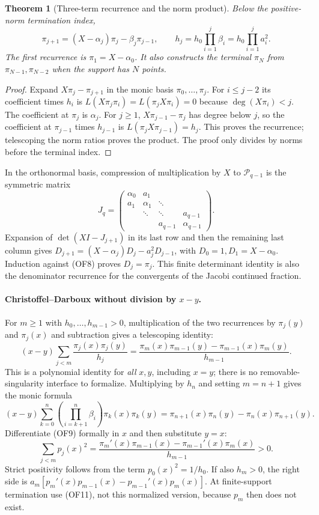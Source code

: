 \documentclass[11pt,a4paper]{article}
\newtheorem{theorem}{Theorem}[section]
\theoremstyle{definition}
\begin{document}
\begin{theorem}[Three-term recurrence and the norm product]
Below the positive-norm termination index,
\[
 \pi_{j+1}=(X-\alpha_j)\pi_j-\beta_j\pi_{j-1},\qquad
 h_j=h_0\prod_{i=1}^{j}\beta_i=h_0\prod_{i=1}^{j}a_i^2.         \tag{OF8}
\]
The first recurrence is $\pi_1=X-\alpha_0$.
It also constructs the terminal $\pi_N$ from $\pi_{N-1},\pi_{N-2}$
when the support has $N$ points.
\end{theorem}
\begin{proof}
Expand $X\pi_j-\pi_{j+1}$ in the monic basis
$\pi_0,\ldots,\pi_j$. For $i\le j-2$ its coefficient times $h_i$ is
$L(X\pi_j\pi_i)=L(\pi_jX\pi_i)=0$ because $\deg(X\pi_i)<j$.
The coefficient at $\pi_j$ is $\alpha_j$.
For $j\ge1$, $X\pi_{j-1}-\pi_j$ has degree below $j$, so the coefficient
at $\pi_{j-1}$ times $h_{j-1}$ is $L(\pi_jX\pi_{j-1})=h_j$.
This proves the recurrence; telescoping the norm ratios proves the
product. The proof only divides by norms before the terminal index.
\end{proof}

In the orthonormal basis, compression of multiplication by $X$ to
$\mathcal P_{q-1}$ is the symmetric matrix
\[
 J_q=\begin{pmatrix}
 \alpha_0&a_1&&\\a_1&\alpha_1&\ddots&\\
 &\ddots&\ddots&a_{q-1}\\&&a_{q-1}&\alpha_{q-1}
 \end{pmatrix}.
\]
Expansion of $\det(XI-J_{j+1})$ in its last row and then the remaining
last column gives
$D_{j+1}=(X-\alpha_j)D_j-a_j^2D_{j-1}$, with $D_0=1,D_1=X-\alpha_0$.
Induction against (OF8) proves $D_j=\pi_j$. This finite determinant
identity is also the denominator recurrence for the convergents of the
Jacobi continued fraction.

\paragraph{Christoffel--Darboux without division by $x-y$.}
For $m\ge1$ with $h_0,\ldots,h_{m-1}>0$, multiplication of the two
recurrences by $\pi_j(y)$ and $\pi_j(x)$ and subtraction gives a
telescoping identity:
\[
 (x-y)\sum_{j<m}\frac{\pi_j(x)\pi_j(y)}{h_j}
 =\frac{\pi_m(x)\pi_{m-1}(y)-\pi_{m-1}(x)\pi_m(y)}{h_{m-1}}.
                                                                    \tag{OF9}
\]
This is a polynomial identity for \emph{all} $x,y$, including $x=y$;
there is no removable-singularity interface to formalize. Multiplying by
$h_n$ and setting $m=n+1$ gives the monic formula
\[
 (x-y)\sum_{k=0}^{n}\left(\prod_{i=k+1}^{n}\beta_i\right)
 \pi_k(x)\pi_k(y)
 =\pi_{n+1}(x)\pi_n(y)-\pi_n(x)\pi_{n+1}(y).                  \tag{OF10}
\]
Differentiate (OF9) formally in $x$ and then substitute $y=x$:
\[
 \sum_{j<m}p_j(x)^2
 =\frac{\pi_m'(x)\pi_{m-1}(x)-\pi_{m-1}'(x)\pi_m(x)}{h_{m-1}}
 >0.                                                          \tag{OF11}
\]
Strict positivity follows from the term $p_0(x)^2=1/h_0$.
If also $h_m>0$, the right side is
$a_m[p_m'(x)p_{m-1}(x)-p_{m-1}'(x)p_m(x)]$.
At finite-support termination use (OF11), not this normalized version,
because $p_m$ then does not exist.
\end{document}
